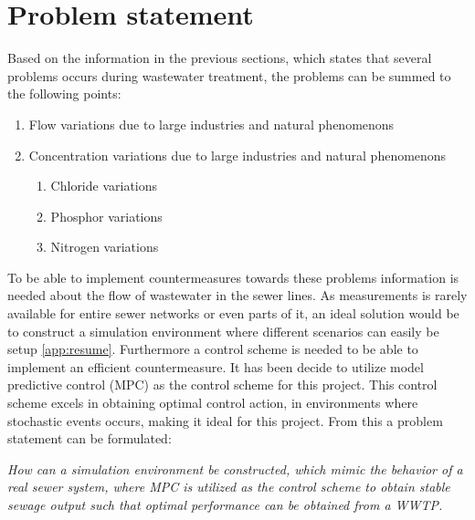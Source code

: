 \newpage
\section{Problem statement}
\label{sec:problem_statement}

Based on the information in the previous sections, which states that several problems occurs during wastewater treatment, the problems can be summed to the following points:

\begin{enumerate}
\item Flow variations due to large industries and natural phenomenons
\item Concentration variations due to large industries and natural phenomenons
\begin{enumerate}
	\item Chloride variations
	\item Phosphor variations
	\item Nitrogen variations
\end{enumerate}
\end{enumerate}

To be able to implement countermeasures towards these problems information is needed about the flow of wastewater in the sewer lines. As measurements is rarely available for entire sewer networks or even parts of it, an ideal solution would be to construct a simulation environment where different scenarios can easily be setup \ref{app:resume}. Furthermore a control scheme is needed to be able to implement an efficient countermeasure. It has been decide to utilize model predictive control (MPC) as the control scheme for this project. This control scheme excels in obtaining optimal control action, in environments where stochastic events occurs, making it ideal for this project.
From this a problem statement can be formulated: \\
\begin{center}
\textit{How can a simulation environment be constructed, which mimic the behavior of a real sewer system, where MPC is utilized as the control scheme to obtain stable sewage output such that optimal performance can be obtained from a WWTP.}
\end{center}